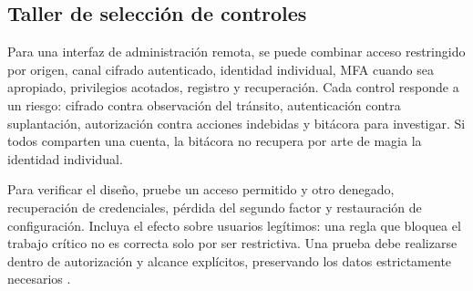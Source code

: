 \subsection{Taller de selección de controles}
Para una interfaz de administración remota, se puede combinar acceso restringido por origen, canal cifrado autenticado, identidad individual, MFA cuando sea apropiado, privilegios acotados, registro y recuperación. Cada control responde a un riesgo: cifrado contra observación del tránsito, autenticación contra suplantación, autorización contra acciones indebidas y bitácora para investigar. Si todos comparten una cuenta, la bitácora no recupera por arte de magia la identidad individual.

Para verificar el diseño, pruebe un acceso permitido y otro denegado, recuperación de credenciales, pérdida del segundo factor y restauración de configuración. Incluya el efecto sobre usuarios legítimos: una regla que bloquea el trabajo crítico no es correcta solo por ser restrictiva. Una prueba debe realizarse dentro de autorización y alcance explícitos, preservando los datos estrictamente necesarios \cite{nistsecurity,tls,owasp}.

